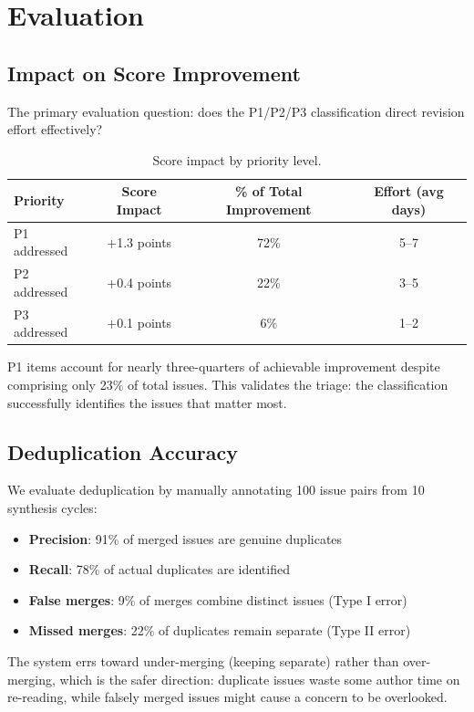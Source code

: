 \section{Evaluation}

\subsection{Impact on Score Improvement}

The primary evaluation question: does the P1/P2/P3 classification direct revision effort effectively?

\begin{table}[h]
\centering
\begin{tabular}{lccc}
\toprule
Priority & Score Impact & \% of Total Improvement & Effort (avg days) \\
\midrule
P1 addressed & +1.3 points & 72\% & 5--7 \\
P2 addressed & +0.4 points & 22\% & 3--5 \\
P3 addressed & +0.1 points & 6\% & 1--2 \\
\bottomrule
\end{tabular}
\caption{Score impact by priority level.}
\end{table}

P1 items account for nearly three-quarters of achievable improvement despite comprising only 23\% of total issues. This validates the triage: the classification successfully identifies the issues that matter most.

\subsection{Deduplication Accuracy}

We evaluate deduplication by manually annotating 100 issue pairs from 10 synthesis cycles:

\begin{itemize}
    \item \textbf{Precision}: 91\% of merged issues are genuine duplicates
    \item \textbf{Recall}: 78\% of actual duplicates are identified
    \item \textbf{False merges}: 9\% of merges combine distinct issues (Type I error)
    \item \textbf{Missed merges}: 22\% of duplicates remain separate (Type II error)
\end{itemize}

The system errs toward under-merging (keeping separate) rather than over-merging, which is the safer direction: duplicate issues waste some author time on re-reading, while falsely merged issues might cause a concern to be overlooked.

